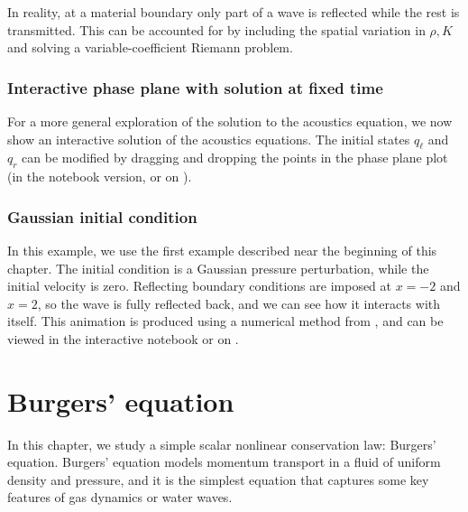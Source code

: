 \documentclass{SIAMbook2016}
\begin{document}
In reality, at a material boundary only part of a wave is reflected
while the rest is transmitted. This can be accounted for by including
the spatial variation in \(\rho, K\) and solving a variable-coefficient
Riemann problem.

\hypertarget{interactive-phase-plane-with-solution-at-fixed-time}{%
\subsection{Interactive phase plane with solution at fixed
time}\label{interactive-phase-plane-with-solution-at-fixed-time}}

For a more general exploration of the solution to the acoustics
equation, we now show an interactive solution of the acoustics
equations. The initial states \(q_\ell\) and \(q_r\) can be modified by
dragging and dropping the points in the phase plane plot (in the
notebook version, or on
).

\hypertarget{gaussian-initial-condition}{%
\subsection{Gaussian initial
condition}\label{gaussian-initial-condition}}

In this example, we use the first example described near the beginning
of this chapter. The initial condition is a Gaussian pressure
perturbation, while the initial velocity is zero. Reflecting boundary
conditions are imposed at \(x=-2\) and \(x=2\), so the wave is fully
reflected back, and we can see how it interacts with itself. This
animation is produced using a numerical method from
, and can be viewed in the
interactive notebook or on
.

\hypertarget{burgers-equation}{%
\chapter{Burgers' equation}\label{burgers-equation}}
\label{sec:04-Burgers}
In this chapter, we study a simple scalar nonlinear conservation law:
Burgers' equation. Burgers' equation models momentum transport in a
fluid of uniform density and pressure, and it is the simplest equation
that captures some key features of gas dynamics or water waves.
\end{document}
